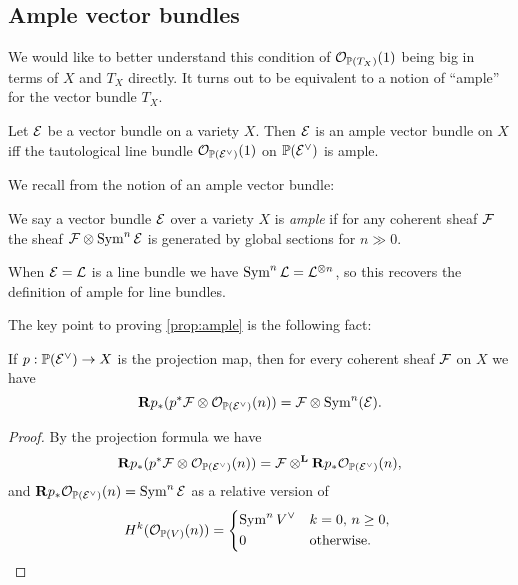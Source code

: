 \subsection{Ample vector bundles}

We would like to better understand this condition of $\mathcal{O}_{\mathbb{P}(T_X)}(1)$ being
big in terms of $X$ and $T_X$ directly. It turns out to be equivalent to a
notion of ``ample'' for the vector bundle $T_X$.

\begin{proposition} \label{prop:ample}
    Let $\mathcal{E}$ be a vector bundle on a variety $X$. Then $\mathcal{E}$ is an ample
    vector bundle on $X$ iff the tautological line bundle
    $\mathcal{O}_{\mathbb{P}(\mathcal{E}^\vee)}(1)$ on $\mathbb{P}(\mathcal{E}^\vee)$ is ample.
\end{proposition}

We recall from \cite{hartshorne_66} the notion of an ample vector bundle:

\begin{definition}
    We say a vector bundle $\mathcal{E}$ over a variety $X$ is \emph{ample} if for any
    coherent sheaf $\mathcal{F}$ the sheaf $\mathcal{F}\otimes\operatorname{Sym}^n\mathcal{E}$ is generated by
    global sections for $n\gg0$.
\end{definition}

\begin{remark}
    When $\mathcal{E}=\mathcal{L}$ is a line bundle we have $\operatorname{Sym}^n\mathcal{L}=\mathcal{L}^{\otimes n}$,
    so this recovers the definition of ample for line bundles.
\end{remark}

The key point to proving \cref{prop:ample} is the following fact:

\begin{lemma}
    If $p:\mathbb{P}(\mathcal{E}^\vee)\to X$ is the projection map, then for every coherent
    sheaf $\mathcal{F}$ on $X$ we have
    \begin{equation*}
        \mathbf{R} p_*(p^*\mathcal{F}\otimes\mathcal{O}_{\mathbb{P}(\mathcal{E}^\vee)}(n))
            = \mathcal{F}\otimes\operatorname{Sym}^n(\mathcal{E}).
    \end{equation*}
\end{lemma}

\begin{proof}
    By the projection formula we have
    \begin{equation*}
        \mathbf{R} p_*(p^*\mathcal{F}\otimes\mathcal{O}_{\mathbb{P}(\mathcal{E}^\vee)}(n))
            = \mathcal{F}\otimes^{\mathbf{L}}\mathbf{R} p_*\mathcal{O}_{\mathbb{P}(\mathcal{E}^\vee)}(n),
    \end{equation*}
    and $\mathbf{R} p_*\mathcal{O}_{\mathbb{P}(\mathcal{E}^\vee)}(n)=\operatorname{Sym}^n\mathcal{E}$ as a relative version of
    \begin{equation*}
        H^k(\O_{\P(V)}(n)) = \begin{dcases*}
            \Sym^nV^\vee & $k=0$, $n\ge0$, \\
            0 & otherwise.
        \end{dcases*}
    \end{equation*}
\end{proof}

